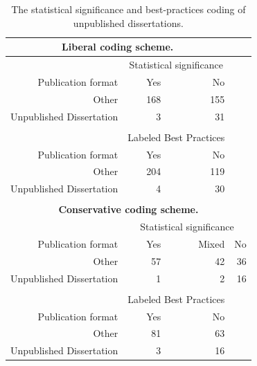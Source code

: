 \documentclass[man]{apa6}
\begin{document}
\begin{table}[htbp]
	\centering
	\caption{The statistical significance and best-practices coding of unpublished dissertations.}
	\begin{tabular}{rrrr}
		\toprule
		\multicolumn{3}{c}{\textbf{Liberal coding scheme.}} &  \\
		\midrule
		& \multicolumn{2}{c}{Statistical significance} &  \\
		Publication format & Yes   & No    &  \\
		Other & 168   & 155   &  \\
		Unpublished Dissertation & 3     & 31    &  \\
		&       &       &  \\
		& \multicolumn{2}{c}{Labeled Best Practices} &  \\
		Publication format & Yes   & No    &  \\
		Other & 204   & 119   &  \\
		Unpublished Dissertation & 4     & 30    &  \\
		&       &       &  \\
		\multicolumn{4}{c}{\textbf{Conservative coding scheme.}} \\
		& \multicolumn{3}{c}{Statistical significance} \\
		Publication format & Yes   & Mixed & No \\
		Other & 57    & 42    & 36 \\
		Unpublished Dissertation & 1     & 2     & 16 \\
		&       &       &  \\
		& \multicolumn{2}{c}{Labeled Best Practices} &  \\
		Publication format & Yes   & No    &  \\
		Other & 81    & 63    &  \\
		Unpublished Dissertation & 3     & 16    &  \\
		\bottomrule
	\end{tabular}%
	\label{table:dissertations}%
\end{table}
\end{document}
